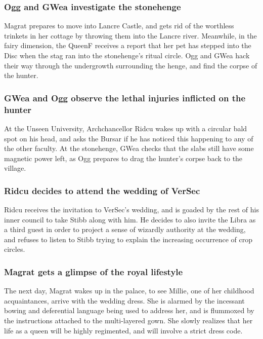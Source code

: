 \subsubsection{\Gls{Ogg} and \Gls{GWea} investigate the stonehenge}
\Gls{Magrat} prepares to move into Lancre Castle, and gets rid of the worthless trinkets in her
cottage by throwing them into the Lancre river. Meanwhile, in the fairy dimension, the \Gls{QueenF}
receives a report that her pet has stepped into the Disc when the stag ran into the stonehenge's
ritual circle. \Gls{Ogg} and \Gls{GWea} hack their way through the undergrowth surrounding the
henge, and find the corpse of the hunter.

\subsubsection{\Gls{GWea} and \Gls{Ogg} observe the lethal injuries inflicted on the hunter}
At the Unseen University, Archchancellor \Gls{Ridcu} wakes up with a circular bald spot on his head,
and asks the \Gls{Bursar} if he has noticed this happening to any of the other faculty. At the
stonehenge, \Gls{GWea} checks that the slabs still have some magnetic power left, as \Gls{Ogg}
prepares to drag the hunter's corpse back to the village.

\subsubsection{\Gls{Ridcu} decides to attend the wedding of \Gls{VerSec}}
\Gls{Ridcu} receives the invitation to \Gls{VerSec}'s wedding, and is goaded by the rest of his
inner council to take \Gls{Stibb} along with him. He decides to also invite the \Gls{Libra} as a
third guest in order to project a sense of wizardly authority at the wedding, and refuses to listen
to \Gls{Stibb} trying to explain the increasing occurrence of crop circles.

\subsubsection{\Gls{Magrat} gets a glimpse of the royal lifestyle}
The next day, \Gls{Magrat} wakes up in the palace, to see \Gls{Millie}, one of her childhood
acquaintances, arrive with the wedding dress. She is alarmed by the incessant bowing and deferential
language being used to address her, and is flummoxed by the instructions attached to the
multi-layered gown. She slowly realizes that her life as a queen will be highly regimented, and
will involve a strict dress code.

